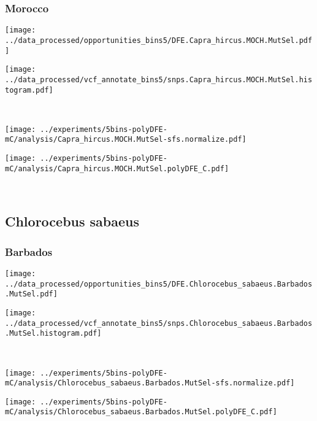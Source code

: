 \subsubsection{Morocco}

\begin{minipage}{0.49\linewidth}
    \texttt{[image: ../data\_processed/opportunities\_bins5/DFE.Capra\_hircus.MOCH.MutSel.pdf]}
\end{minipage}
\begin{minipage}{0.49\linewidth}
    \texttt{[image: ../data\_processed/vcf\_annotate\_bins5/snps.Capra\_hircus.MOCH.MutSel.histogram.pdf]}
\end{minipage}
\\
\begin{minipage}{0.49\linewidth}
    \texttt{[image: ../experiments/5bins-polyDFE-mC/analysis/Capra\_hircus.MOCH.MutSel-sfs.normalize.pdf]}
\end{minipage}
\begin{minipage}{0.49\linewidth}
    \texttt{[image: ../experiments/5bins-polyDFE-mC/analysis/Capra\_hircus.MOCH.MutSel.polyDFE\_C.pdf]}
\end{minipage}
\\

\subsection{Chlorocebus sabaeus}

\subsubsection{Barbados}

\begin{minipage}{0.49\linewidth}
    \texttt{[image: ../data\_processed/opportunities\_bins5/DFE.Chlorocebus\_sabaeus.Barbados.MutSel.pdf]}
\end{minipage}
\begin{minipage}{0.49\linewidth}
    \texttt{[image: ../data\_processed/vcf\_annotate\_bins5/snps.Chlorocebus\_sabaeus.Barbados.MutSel.histogram.pdf]}
\end{minipage}
\\
\begin{minipage}{0.49\linewidth}
    \texttt{[image: ../experiments/5bins-polyDFE-mC/analysis/Chlorocebus\_sabaeus.Barbados.MutSel-sfs.normalize.pdf]}
\end{minipage}
\begin{minipage}{0.49\linewidth}
    \texttt{[image: ../experiments/5bins-polyDFE-mC/analysis/Chlorocebus\_sabaeus.Barbados.MutSel.polyDFE\_C.pdf]}
\end{minipage}
\\

